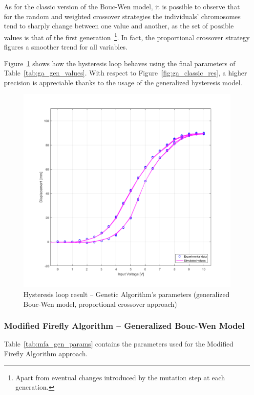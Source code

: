 As for the classic version of the Bouc-Wen model, it is possible to observe
that for the random and weighted crossover strategies the individuals' chromosomes
tend to sharply change between one value and another, as the set of possible values
is that of the first generation~\footnote{
Apart from eventual changes introduced by the mutation step at each generation.}.
In fact, the proportional crossover strategy figures a smoother trend for all variables.

Figure~\ref{fig:ga_gen_hys} shows how the hysteresis loop behaves using the final parameters of Table~\ref{tab:ga_gen_values}.
With respect to Figure~\ref{fig:ga_classic_res}, a higher precision is appreciable
thanks to the usage of the generalized hysteresis model.

\begin{figure}[H]
	\centering
	\includegraphics[width=\linewidth]{Images/ga_general_prop}
	\caption{Hysteresis loop result -- Genetic Algorithm's parameters (generalized Bouc-Wen model, proportional crossover approach)}
	\label{fig:ga_gen_hys}
\end{figure}

\subsubsection{Modified Firefly Algorithm -- Generalized Bouc-Wen Model}

Table~\ref{tab:mfa_gen_params} contains the parameters used for the
Modified Firefly Algorithm approach. 

